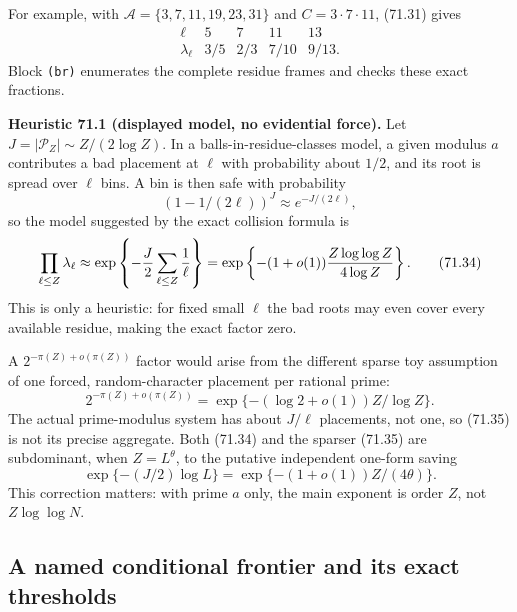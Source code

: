 \documentclass[10pt,reqno]{amsart}
\theoremstyle{definition}
\newcommand{\1}{\mathbf 1}
\begin{document}
For example, with
$\mathcal A=\{3,7,11,19,23,31\}$ and $C=3\cdot7\cdot11$, (71.31)
gives
\begin{equation}
\begin{array}{c|rrrr}
\ell&5&7&11&13\\ \hline
\lambda_\ell&3/5&2/3&7/10&9/13.
\end{array}                                                \tag{71.32}
\end{equation}
Block \texttt{(br)} enumerates the complete residue frames and checks these exact
fractions.

\medskip\noindent\textbf{Heuristic 71.1 (displayed model, no evidential force).}  Let
$J=|\mathcal P_Z|\sim Z/(2\log Z)$.  In a balls-in-residue-classes model,
a given modulus $a$ contributes a bad placement at $\ell$ with
probability about $1/2$, and its root is spread over $\ell$ bins.  A bin
is then safe with probability
\begin{equation}
        (1-1/(2\ell))^J\approx e^{-J/(2\ell)},             \tag{71.33}
\end{equation}
so the model suggested by the exact collision formula is
\begin{equation}
 \prod_{\ell\leq Z}\lambda_\ell
 \approx\exp\left\{-{J\over2}\sum_{\ell\leq Z}{1\over\ell}\right\}
 =\exp\left\{-(1+o(1)){Z\log\log Z\over4\log Z}\right\}. \tag{71.34}
\end{equation}
This is only a heuristic: for fixed small $\ell$ the bad roots may even
cover every available residue, making the exact factor zero.

A $2^{-\pi(Z)+o(\pi(Z))}$ factor would arise from the different sparse toy
assumption of one forced, random-character placement per rational prime:
\begin{equation}
 2^{-\pi(Z)+o(\pi(Z))}
   =\exp\{-(\log2+o(1))Z/\log Z\}.                        \tag{71.35}
\end{equation}
The actual prime-modulus system has about $J/\ell$ placements, not one,
so (71.35) is not its precise aggregate.  Both (71.34) and the sparser
(71.35) are subdominant, when $Z=L^\theta$, to the putative independent
one-form saving
\begin{equation}
 \exp\{-(J/2)\log L\}
       =\exp\{-(1+o(1))Z/(4\theta)\}.                     \tag{71.36}
\end{equation}
This correction matters: with prime $a$ only, the main exponent is
order $Z$, not $Z\log\log N$.

\subsection{A named conditional frontier and its exact thresholds}
\end{document}
